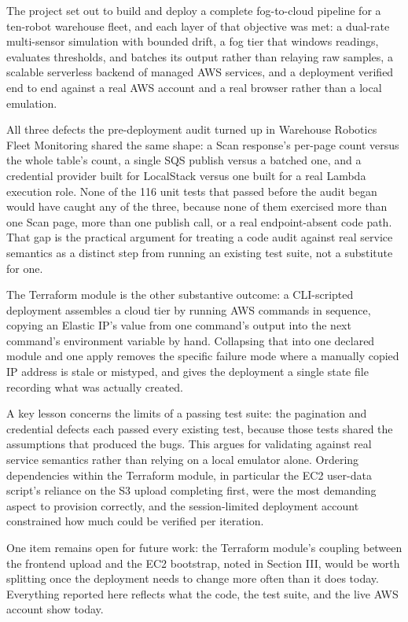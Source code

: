 \documentclass[conference]{IEEEtran}
\begin{document}
The project set out to build and deploy a complete fog-to-cloud pipeline for a ten-robot warehouse fleet, and each layer of that objective was met: a dual-rate multi-sensor simulation with bounded drift, a fog tier that windows readings, evaluates thresholds, and batches its output rather than relaying raw samples, a scalable serverless backend of managed AWS services, and a deployment verified end to end against a real AWS account and a real browser rather than a local emulation.

All three defects the pre-deployment audit turned up in Warehouse Robotics Fleet Monitoring shared the same shape: a Scan response's per-page count versus the whole table's count, a single SQS publish versus a batched one, and a credential provider built for LocalStack versus one built for a real Lambda execution role. None of the 116 unit tests that passed before the audit began would have caught any of the three, because none of them exercised more than one Scan page, more than one publish call, or a real endpoint-absent code path. That gap is the practical argument for treating a code audit against real service semantics as a distinct step from running an existing test suite, not a substitute for one.

The Terraform module is the other substantive outcome: a CLI-scripted deployment assembles a cloud tier by running AWS commands in sequence, copying an Elastic IP's value from one command's output into the next command's environment variable by hand. Collapsing that into one declared module and one apply removes the specific failure mode where a manually copied IP address is stale or mistyped, and gives the deployment a single state file recording what was actually created.

A key lesson concerns the limits of a passing test suite: the pagination and credential defects each passed every existing test, because those tests shared the assumptions that produced the bugs. This argues for validating against real service semantics rather than relying on a local emulator alone. Ordering dependencies within the Terraform module, in particular the EC2 user-data script's reliance on the S3 upload completing first, were the most demanding aspect to provision correctly, and the session-limited deployment account constrained how much could be verified per iteration.

One item remains open for future work: the Terraform module's coupling between the frontend upload and the EC2 bootstrap, noted in Section III, would be worth splitting once the deployment needs to change more often than it does today. Everything reported here reflects what the code, the test suite, and the live AWS account show today.



\end{document}

